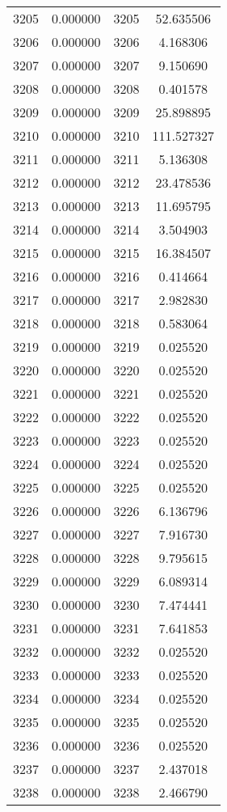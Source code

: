 \documentclass[12pt]{article}
\begin{document}
\begin{longtable}{@{}cccc@{}}
3205 & 0.000000 & 3205 & 52.635506 \\
3206 & 0.000000 & 3206 & 4.168306 \\
3207 & 0.000000 & 3207 & 9.150690 \\
3208 & 0.000000 & 3208 & 0.401578 \\
3209 & 0.000000 & 3209 & 25.898895 \\
3210 & 0.000000 & 3210 & 111.527327 \\
3211 & 0.000000 & 3211 & 5.136308 \\
3212 & 0.000000 & 3212 & 23.478536 \\
3213 & 0.000000 & 3213 & 11.695795 \\
3214 & 0.000000 & 3214 & 3.504903 \\
3215 & 0.000000 & 3215 & 16.384507 \\
3216 & 0.000000 & 3216 & 0.414664 \\
3217 & 0.000000 & 3217 & 2.982830 \\
3218 & 0.000000 & 3218 & 0.583064 \\
3219 & 0.000000 & 3219 & 0.025520 \\
3220 & 0.000000 & 3220 & 0.025520 \\
3221 & 0.000000 & 3221 & 0.025520 \\
3222 & 0.000000 & 3222 & 0.025520 \\
3223 & 0.000000 & 3223 & 0.025520 \\
3224 & 0.000000 & 3224 & 0.025520 \\
3225 & 0.000000 & 3225 & 0.025520 \\
3226 & 0.000000 & 3226 & 6.136796 \\
3227 & 0.000000 & 3227 & 7.916730 \\
3228 & 0.000000 & 3228 & 9.795615 \\
3229 & 0.000000 & 3229 & 6.089314 \\
3230 & 0.000000 & 3230 & 7.474441 \\
3231 & 0.000000 & 3231 & 7.641853 \\
3232 & 0.000000 & 3232 & 0.025520 \\
3233 & 0.000000 & 3233 & 0.025520 \\
3234 & 0.000000 & 3234 & 0.025520 \\
3235 & 0.000000 & 3235 & 0.025520 \\
3236 & 0.000000 & 3236 & 0.025520 \\
3237 & 0.000000 & 3237 & 2.437018 \\
3238 & 0.000000 & 3238 & 2.466790 \\

\end{longtable}
\end{document}
